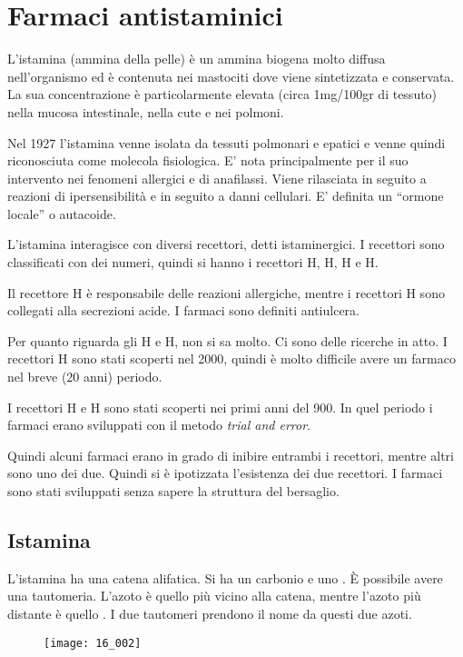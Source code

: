 \chapter{Farmaci antistaminici}

L'istamina (ammina della pelle) è un ammina biogena molto diffusa nell'organismo
ed è contenuta nei mastociti dove viene sintetizzata e conservata. La sua
concentrazione è particolarmente elevata (circa 1mg/100gr di tessuto) nella mucosa
intestinale, nella cute e nei polmoni.

Nel 1927 l’istamina venne isolata da tessuti
polmonari e epatici e venne quindi riconosciuta come molecola fisiologica.
E’ nota principalmente per il suo intervento nei fenomeni allergici e di anafilassi.
Viene rilasciata in seguito a reazioni di ipersensibilità e in seguito a danni cellulari.
E’ definita un  ``ormone locale'' o autacoide.

L'istamina interagisce con diversi recettori, detti istaminergici. I
recettori sono classificati con dei numeri, quindi si hanno i recettori H, H, H e H.


Il recettore H è responsabile delle reazioni allergiche, mentre i
recettori H sono collegati alla secrezioni acide. I farmaci sono
definiti antiulcera.

Per quanto riguarda gli H e H, non si sa molto. Ci sono delle ricerche
in atto. I recettori H sono stati scoperti nel 2000, quindi è molto
difficile avere un farmaco nel breve (20 anni) periodo.

I recettori H e H sono stati scoperti nei primi anni del 900. In quel
periodo i farmaci erano sviluppati con il metodo \emph{trial and error}.

Quindi alcuni farmaci erano in grado di inibire entrambi i recettori,
mentre altri sono uno dei due. Quindi si è ipotizzata l'esistenza dei
due recettori. I farmaci sono stati sviluppati senza sapere la struttura
del bersaglio.

\section{Istamina}

L'istamina ha una catena alifatica. Si ha un carbonio \alpha{} e uno
\beta. È possibile avere una tautomeria.
L'azoto \pi{} è quello più vicino alla catena, mentre l'azoto più
distante è quello \tau.
I due tautomeri prendono il nome da questi due azoti.
\begin{figure}[H]
  \centering
  \texttt{[image: 16\_002]}
\end{figure}

